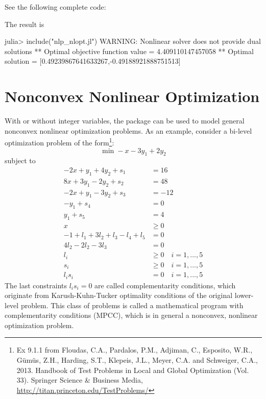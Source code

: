 See the following complete code:
\begin{codelisting}
\end{codelisting}
\noindent The result is
\begin{code}
julia> include("nlp_nlopt.jl")
WARNING: Nonlinear solver does not provide dual solutions
** Optimal objective function value = 4.409110147457058
** Optimal solution = [0.49239867641633267,-0.49188921888751513]
\end{code}










\section{Nonconvex Nonlinear Optimization}

With or without integer variables, the \jump{} package can be used to model general nonconvex nonlinear optimization problems. As an example, consider a bi-level optimization problem of the form\footnote{Ex 9.1.1 from Floudas, C.A., Pardalos, P.M., Adjiman, C., Esposito, W.R., Gümüs, Z.H., Harding, S.T., Klepeis, J.L., Meyer, C.A. and Schweiger, C.A., 2013. Handbook of Test Problems in Local and Global Optimization (Vol. 33). Springer Science \& Business Media, \url{http://titan.princeton.edu/TestProblems/}}:
\begin{equation*}
\min -x -3y_1 +2y_2
\end{equation*}
subject to
\begin{align*}
    -2x + y_1 + 4y_2 + s_1 &= 16 \\
    8x + 3y_1 - 2y_2 + s_2 &= 48 \\
    -2x + y_1 - 3y_2 + s_3 &= -12 \\
    -y_1 + s_4 &= 0  \\
    y_1 + s_5 &= 4 \\
    x &\geq 0  \\
    -1 + l_1 + 3l_2 + l_3 - l_4 + l_5 &= 0 \\
    4l_2 - 2l_2 - 3l_3 &= 0 \\
    l_i &\geq 0 \quad i=1,...,5 \\
    s_i &\geq 0 \quad i=1,...,5 \\
    l_i s_i &= 0 \quad i=1,...,5
\end{align*}
The last constraints $l_is_i=0$ are called complementarity conditions, which originate from Karush-Kuhn-Tucker optimality conditions of the original lower-level problem. This class of problems is called a mathematical program with complementarity conditions (MPCC), which is in general a nonconvex, nonlinear optimization problem.

